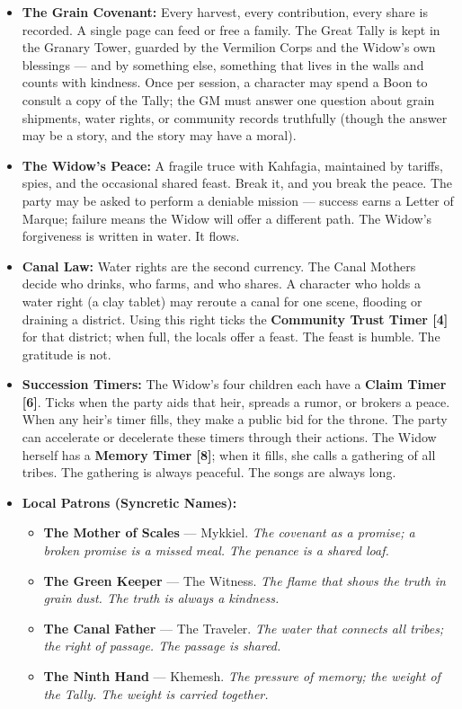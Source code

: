 \begin{itemize}
\item \textbf{The Grain Covenant:} Every harvest, every contribution, every share is recorded. A single page can feed or free a family. The Great Tally is kept in the Granary Tower, guarded by the Vermilion Corps and the Widow's own blessings --- and by something else, something that lives in the walls and counts with kindness. Once per session, a character may spend a Boon to consult a copy of the Tally; the GM must answer one question about grain shipments, water rights, or community records truthfully (though the answer may be a story, and the story may have a moral).

\item \textbf{The Widow's Peace:} A fragile truce with Kahfagia, maintained by tariffs, spies, and the occasional shared feast. Break it, and you break the peace. The party may be asked to perform a deniable mission --- success earns a Letter of Marque; failure means the Widow will offer a different path. The Widow's forgiveness is written in water. It flows.

\item \textbf{Canal Law:} Water rights are the second currency. The Canal Mothers decide who drinks, who farms, and who shares. A character who holds a water right (a clay tablet) may reroute a canal for one scene, flooding or draining a district. Using this right ticks the \textbf{Community Trust Timer [4]} for that district; when full, the locals offer a feast. The feast is humble. The gratitude is not.

\item \textbf{Succession Timers:} The Widow's four children each have a \textbf{Claim Timer [6]}. Ticks when the party aids that heir, spreads a rumor, or brokers a peace. When any heir's timer fills, they make a public bid for the throne. The party can accelerate or decelerate these timers through their actions. The Widow herself has a \textbf{Memory Timer [8]}; when it fills, she calls a gathering of all tribes. The gathering is always peaceful. The songs are always long.

\item \textbf{Local Patrons (Syncretic Names):}
  \begin{itemize}
    \item \textbf{The Mother of Scales} --- Mykkiel. \textit{The covenant as a promise; a broken promise is a missed meal. The penance is a shared loaf.}
    \item \textbf{The Green Keeper} --- The Witness. \textit{The flame that shows the truth in grain dust. The truth is always a kindness.}
    \item \textbf{The Canal Father} --- The Traveler. \textit{The water that connects all tribes; the right of passage. The passage is shared.}
    \item \textbf{The Ninth Hand} --- Khemesh. \textit{The pressure of memory; the weight of the Tally. The weight is carried together.}
  \end{itemize}
\end{itemize}

